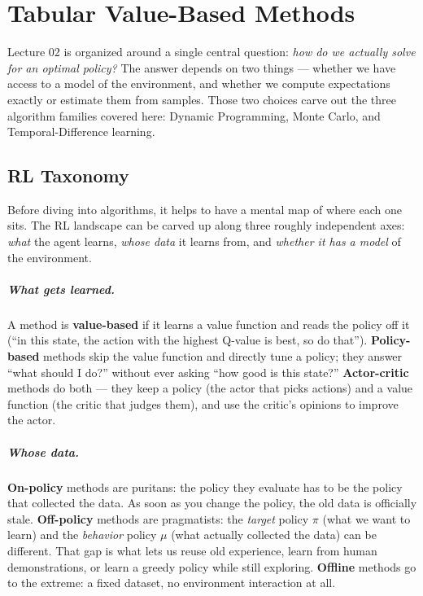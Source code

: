 \documentclass[11pt, oneside]{book}
\begin{document}
\chapter{Tabular Value-Based Methods}
\label{chap:tabular}

Lecture 02 is organized around a single central question: \emph{how do we
actually solve for an optimal policy?}
The answer depends on two things --- whether we have access to a model of the
environment, and whether we compute expectations exactly or estimate them from
samples.
Those two choices carve out the three algorithm families covered here:
Dynamic Programming, Monte Carlo, and Temporal-Difference learning.

\section{RL Taxonomy}

Before diving into algorithms, it helps to have a mental map of where each one sits.
The RL landscape can be carved up along three roughly independent axes: \emph{what}
the agent learns, \emph{whose data} it learns from, and \emph{whether it has a model}
of the environment.

\paragraph{What gets learned.}
A method is \textbf{value-based} if it learns a value function and reads the policy
off it (``in this state, the action with the highest Q-value is best, so do that'').
\textbf{Policy-based} methods skip the value function and directly tune a policy;
they answer ``what should I do?'' without ever asking ``how good is this state?''
\textbf{Actor-critic} methods do both --- they keep a policy (the actor that picks
actions) and a value function (the critic that judges them), and use the critic's
opinions to improve the actor.

\paragraph{Whose data.}
\textbf{On-policy} methods are puritans: the policy they evaluate has to be the policy
that collected the data. As soon as you change the policy, the old data is officially
stale.
\textbf{Off-policy} methods are pragmatists: the \emph{target} policy $\pi$ (what we
want to learn) and the \emph{behavior} policy $\mu$ (what actually collected the data)
can be different. That gap is what lets us reuse old experience, learn from human
demonstrations, or learn a greedy policy while still exploring.
\textbf{Offline} methods go to the extreme: a fixed dataset, no environment interaction
at all.
\end{document}
